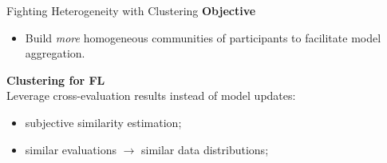 % 
\begin{frame}{Fighting Heterogeneity with Clustering}
  \textbf{Objective}
  \begin{itemize}
    \item Build \emph{more} homogeneous communities of participants to facilitate model aggregation.
  \end{itemize}


    \pause
    \textbf{Clustering for FL}\\
    Leverage cross-evaluation results instead of model updates:
        \begin{itemize}
            \item subjective similarity estimation;
            \item similar evaluations $\rightarrow$ similar data distributions;
        \end{itemize}

        
    
    

\end{frame}

